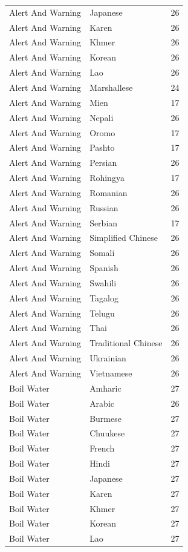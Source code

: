 \begin{longtable}{p{3cm} p{3cm} r}
Alert And Warning & Japanese & 26 \\
Alert And Warning & Karen & 26 \\
Alert And Warning & Khmer & 26 \\
Alert And Warning & Korean & 26 \\
Alert And Warning & Lao & 26 \\
Alert And Warning & Marshallese & 24 \\
Alert And Warning & Mien & 17 \\
Alert And Warning & Nepali & 26 \\
Alert And Warning & Oromo & 17 \\
Alert And Warning & Pashto & 17 \\
Alert And Warning & Persian & 26 \\
Alert And Warning & Rohingya & 17 \\
Alert And Warning & Romanian & 26 \\
Alert And Warning & Russian & 26 \\
Alert And Warning & Serbian & 17 \\
Alert And Warning & Simplified Chinese & 26 \\
Alert And Warning & Somali & 26 \\
Alert And Warning & Spanish & 26 \\
Alert And Warning & Swahili & 26 \\
Alert And Warning & Tagalog & 26 \\
Alert And Warning & Telugu & 26 \\
Alert And Warning & Thai & 26 \\
Alert And Warning & Traditional Chinese & 26 \\
Alert And Warning & Ukrainian & 26 \\
Alert And Warning & Vietnamese & 26 \\
Boil Water & Amharic & 27 \\
Boil Water & Arabic & 26 \\
Boil Water & Burmese & 27 \\
Boil Water & Chuukese & 27 \\
Boil Water & French & 27 \\
Boil Water & Hindi & 27 \\
Boil Water & Japanese & 27 \\
Boil Water & Karen & 27 \\
Boil Water & Khmer & 27 \\
Boil Water & Korean & 27 \\
Boil Water & Lao & 27 \\

\end{longtable}
